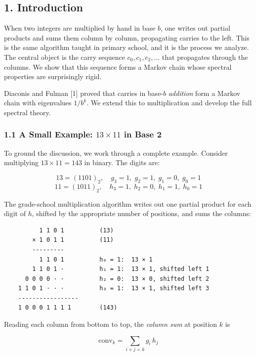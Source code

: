 \documentclass[
  11pt,
]{article}
\begin{document}
\newpage

\subsection{1. Introduction}\label{introduction}

When two integers are multiplied by hand in base \(b\), one writes out partial
products and sums them column by column, propagating carries to the left. This
is the same algorithm taught in primary school, and it is the process we
analyze. The central object is the carry sequence \(c_0, c_1, c_2, \ldots\) that
propagates through the columns. We show that this sequence forms a Markov chain
whose spectral properties are surprisingly rigid.

Diaconis and Fulman {[}1{]} proved that carries in base-\(b\) \emph{addition}
form a Markov chain with eigenvalues \(1/b^k\). We extend this to multiplication
and develop the full spectral theory.

\subsubsection{\texorpdfstring{1.1 A Small Example: \(13 \times 11\) in Base
2}{1.1 A Small Example: 13 \textbackslash times 11 in Base 2}}\label{a-small-example-13-times-11-in-base-2}

To ground the discussion, we work through a complete example. Consider
multiplying \(13 \times 11 = 143\) in binary. The digits are:

\[13 = (1101)_2, \quad g_3 = 1,\; g_2 = 1,\; g_1 = 0,\; g_0 = 1\]
\[11 = (1011)_2, \quad h_3 = 1,\; h_2 = 0,\; h_1 = 1,\; h_0 = 1\]

The grade-school multiplication algorithm writes out one partial product for
each digit of \(h\), shifted by the appropriate number of positions, and sums
the columns:

\begin{verbatim}
          1 1 0 1          (13)
        × 1 0 1 1          (11)
        ---------
          1 1 0 1          h₀ = 1:  13 × 1
        1 1 0 1 ·          h₁ = 1:  13 × 1, shifted left 1
      0 0 0 0 · ·          h₂ = 0:  13 × 0, shifted left 2
    1 1 0 1 · · ·          h₃ = 1:  13 × 1, shifted left 3
    -----------------
    1 0 0 0 1 1 1 1        (143)
\end{verbatim}

Reading each column from bottom to top, the \emph{column sum} at position \(k\)
is

\[\text{conv}_k = \sum_{i+j=k} g_i \, h_j\]
\end{document}
